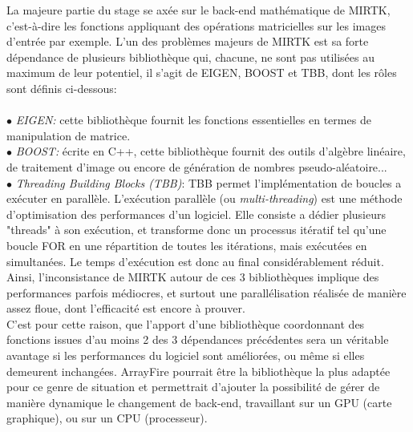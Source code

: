 \documentclass[10pt]{report}
\begin{document}
	La majeure partie du stage se axée sur le back-end mathématique de MIRTK, c'est-à-dire les fonctions appliquant des opérations matricielles sur les images d'entrée par exemple. L'un des problèmes majeurs de MIRTK est sa forte dépendance de plusieurs bibliothèque qui, chacune, ne sont pas utilisées au maximum de leur potentiel, il s'agit de EIGEN, BOOST et TBB, dont les rôles sont définis ci-dessous:\\
		\\{$\bullet$} \textit{EIGEN:} cette bibliothèque fournit les fonctions essentielles en termes de manipulation de matrice. \newline
		\\{$\bullet$} \textit{BOOST:} écrite en C++, cette bibliothèque fournit des outils d'algèbre linéaire, de traitement d'image ou encore de génération de nombres pseudo-aléatoire... \newline
		\\{$\bullet$} \textit{Threading Building Blocks (TBB)}: TBB permet l'implémentation de boucles a exécuter en parallèle. L'exécution parallèle (ou \textit{multi-threading}) est une méthode d'optimisation des performances d'un logiciel. Elle consiste a dédier plusieurs "threads" à son exécution, et transforme donc un processus itératif tel qu'une boucle FOR en une répartition de toutes les itérations, mais exécutées en simultanées. Le temps d'exécution est donc au final considérablement réduit. \newline
	\\ Ainsi, l'inconsistance de MIRTK autour de ces 3 bibliothèques implique des performances parfois médiocres, et surtout une parallélisation réalisée de manière assez floue, dont l'efficacité est encore à prouver.  
	\\ C'est pour cette raison, que l'apport d'une bibliothèque coordonnant des fonctions issues d'au moins 2 des 3 dépendances précédentes sera un véritable avantage si les performances du logiciel sont améliorées, ou même si elles demeurent inchangées. ArrayFire pourrait être la bibliothèque la plus adaptée pour ce genre de situation et permettrait d'ajouter la possibilité de gérer de manière dynamique le changement de back-end, travaillant sur un GPU (carte graphique), ou sur un CPU (processeur).
		

	 
\end{document}
